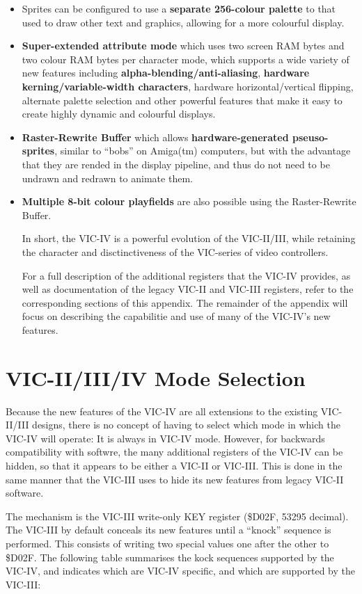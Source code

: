 \begin{itemize}
  \item Sprites can be configured to use a {\bf separate 256-colour palette} to that used to draw other text and graphics, allowing for a more colourful display.
  \item {\bf Super-extended attribute mode} which uses two screen RAM bytes and two colour RAM bytes per character mode, which supports a wide variety of new features including {\bf alpha-blending/anti-aliasing}, {\bf hardware kerning/variable-width characters}, hardware horizontal/vertical flipping, alternate palette selection and other powerful features that make it easy to create highly dynamic and colourful displays.
  \item {\bf Raster-Rewrite Buffer} which allows {\bf hardware-generated pseuso-sprites}, similar to ``bobs'' on Amiga(tm) computers, but with the advantage that they are rended in the display pipeline, and thus do not need to be undrawn and redrawn to animate them.
    \item {\bf Multiple 8-bit colour playfields} are also possible using the Raster-Rewrite Buffer. 

      In short, the VIC-IV is a powerful evolution of the VIC-II/III, while retaining the character and disctinctiveness of the VIC-series of
      video controllers.

      For a full description of the additional registers that the VIC-IV provides, as well as documentation of the legacy VIC-II and VIC-III registers, refer to the corresponding sections of this appendix. The remainder of the appendix will focus on describing the capabilitie and use of many of the VIC-IV's new features.
\end{itemize}

\section{VIC-II/III/IV Mode Selection}
Because the new features of the VIC-IV are all extensions to the existing VIC-II/III designs, there is no concept of having to select which mode in which the VIC-IV will operate: It is always in VIC-IV mode. However, for backwards compatibility with softwre, the many additional registers of the VIC-IV can be hidden, so that it appears to be either a VIC-II or VIC-III. This is done in the same manner that the VIC-III uses to hide its new features from legacy VIC-II software.

 The mechanism is the VIC-III write-only KEY register (\$D02F, 53295 decimal).  The VIC-III by default conceals its new features until a ``knock'' sequence is performed.  This consists of writing two special values one after the other to \$D02F.  The following table summarises the kock sequences supported by the VIC-IV, and indicates which are VIC-IV specific, and which are supported by the VIC-III:

